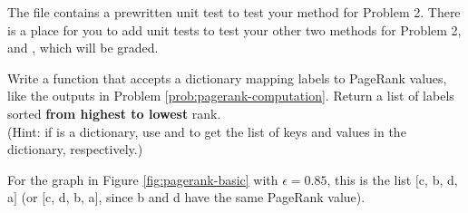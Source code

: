 \begin{unittest}
The file  contains a prewritten unit test to test your  method for Problem 2.
There is a place for you to add unit tests to test your other two methods for Problem 2,  and , which will be graded.
\end{unittest}

\begin{problem}
Write a function that accepts a dictionary mapping labels to PageRank values, like the outputs in Problem \ref{prob:pagerank-computation}.
Return a list of labels sorted \textbf{from highest to lowest} rank.
\\(Hint: if  is a dictionary, use  and  to get the list of keys and values in the dictionary, respectively.)

For the graph in Figure \ref{fig:pagerank-basic} with $\epsilon=0.85$, this is the list $[$c, b, d, a$]$ (or $[$c, d, b, a$]$, since b and d have the same PageRank value).
\label{prob:pagerank-ranking}
\end{problem}

\begin{comment}
Looking at Figure \ref{fig:pagerank-nosinks}, it is easy to see why a has the lowest PageRank value: the only other node that points to it is b.
It also makes sense that c has the highest ranking, since c and d both have edges from the other three nodes pointing to them, but d only has one edge (pointing to c), while c points to both b and d.
In other words, at each step d distributes all of its importance to c, while c splits its importance between b and d.

Of course, constructing rankings is much more difficult to do by hand when there are more than just a few nodes in the graph.
\end{comment}


